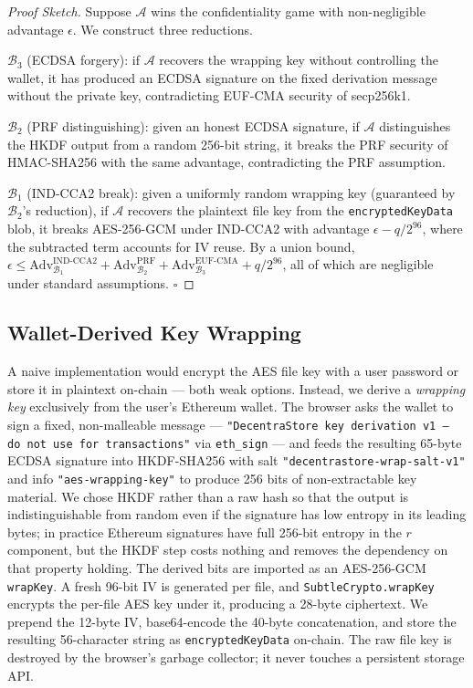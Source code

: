 \documentclass[journal]{IEEEtran}
\begin{document}
\begin{proof}[Proof Sketch]
Suppose $\mathcal{A}$ wins the confidentiality game with non-negligible
advantage $\epsilon$.
We construct three reductions.

$\mathcal{B}_3$ (ECDSA forgery): if $\mathcal{A}$ recovers the wrapping
key without controlling the wallet, it has produced an ECDSA signature
on the fixed derivation message without the private key, contradicting
EUF-CMA security of secp256k1.

$\mathcal{B}_2$ (PRF distinguishing): given an honest ECDSA signature,
if $\mathcal{A}$ distinguishes the HKDF output from a random 256-bit
string, it breaks the PRF security of HMAC-SHA256 with the same
advantage, contradicting the PRF assumption.

$\mathcal{B}_1$ (IND-CCA2 break): given a uniformly random wrapping key
(guaranteed by $\mathcal{B}_2$'s reduction), if $\mathcal{A}$ recovers
the plaintext file key from the \texttt{encryptedKeyData} blob, it
breaks AES-256-GCM under IND-CCA2 with advantage $\epsilon - q/2^{96}$,
where the subtracted term accounts for IV reuse.
By a union bound, $\epsilon \leq
\mathrm{Adv}^{\mathrm{IND\text{-}CCA2}}_{\mathcal{B}_1} +
\mathrm{Adv}^{\mathrm{PRF}}_{\mathcal{B}_2} +
\mathrm{Adv}^{\mathrm{EUF\text{-}CMA}}_{\mathcal{B}_3} + q/2^{96}$,
all of which are negligible under standard assumptions. \hfill$\square$
\end{proof}

\subsection{Wallet-Derived Key Wrapping}
\label{sec:keywrap-detail}

A naive implementation would encrypt the AES file key with a user password
or store it in plaintext on-chain — both weak options.
%
Instead, we derive a \textit{wrapping key} exclusively from the user's
Ethereum wallet. The browser asks the wallet to sign a fixed, non-malleable
message --- \texttt{"DecentraStore key derivation v1 -- do not use for
transactions"} via \texttt{eth\_sign} --- and feeds the resulting 65-byte
ECDSA signature into HKDF-SHA256 with salt \texttt{"decentrastore-wrap-salt-v1"}
and info \texttt{"aes-wrapping-key"} to produce 256 bits of non-extractable
key material. We chose HKDF rather than a raw hash so that the output is
indistinguishable from random even if the signature has low entropy in its
leading bytes; in practice Ethereum signatures have full 256-bit entropy in
the $r$ component, but the HKDF step costs nothing and removes the
dependency on that property holding.
%
The derived bits are imported as an AES-256-GCM \texttt{wrapKey}. A fresh
96-bit IV is generated per file, and \texttt{SubtleCrypto.wrapKey}~\cite{webcrypto}
encrypts the per-file AES key under it, producing a 28-byte ciphertext.
We prepend the 12-byte IV, base64-encode the 40-byte concatenation, and
store the resulting 56-character string as \texttt{encryptedKeyData} on-chain.
The raw file key is destroyed by the browser's garbage collector;
it never touches a persistent storage API.
\end{document}
